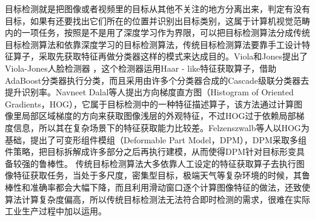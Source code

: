 目标检测就是把图像或者视频里的目标从其他不关注的地方分离出来，判定有没有目标，如果有还要找出它们所在的位置并识别出目标类别，这属于计算机视觉范畴内的一项任务，按照是不是用了深度学习作为界限，可以把目标检测算法分成传统目标检测算法和依靠深度学习的目标检测算法，传统目标检测算法要靠手工设计特征算子，采取先获取特征再做分类器这样的模式来达成目的。Viola和Jones提出了Viola-Jones人脸检测器 \cite{viola2001rapid}，这个检测器运用Haar - like特征获取算子，借助AdaBoost分类器执行分类，而且采用由许多个分类器合成的Cascade级联分类器去提升识别率。Navneet Dalal等人\cite{dalal2005histograms}提出方向梯度直方图（Histogram of Oriented Gradients，HOG），它属于目标检测中的一种特征描述算子，该方法通过计算图像里局部区域梯度的方向来获取图像浅层的外观特征，不过HOG过于依赖局部梯度信息，所以其在复杂场景下的特征获取能力比较差。Felzenszwalb等人\cite{felzenszwalb2009object}以HOG为基础，提出了可变形组件模组（Deformable Part Model，DPM），DPM采取多组件策略，把目标拆解成许多部分之后再执行建模，从而使得DPM针对目标形变具备较强的鲁棒性。 传统目标检测算法大多依靠人工设定的特征获取算子去执行图像特征获取任务，当处于多尺度，密集型目标，极端天气等复杂环境的时候，其鲁棒性和准确率都会大幅下降，而且利用滑动窗口逐个计算图像特征的做法，还致使算法计算复杂度偏高，所以传统目标检测法无法符合即时检测的需求，很难在实际工业生产过程中加以运用。

